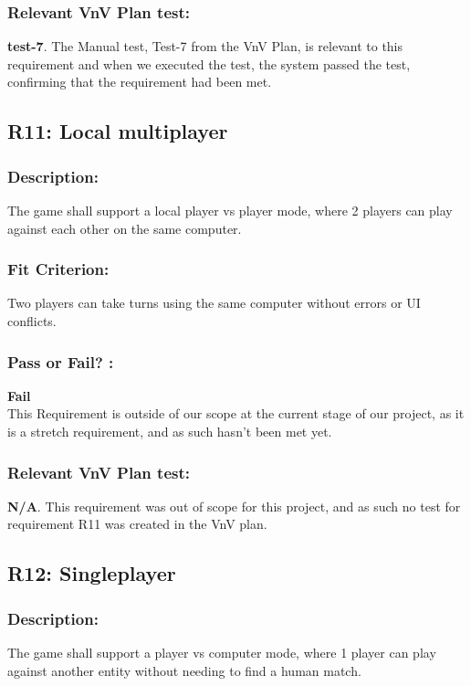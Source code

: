 \documentclass[12pt, titlepage]{article}
\begin{document}
\subsubsection*{Relevant VnV Plan test: } \textbf{test-7}.  The Manual test, Test-7 from the VnV Plan, is relevant to this requirement and when we executed the test, the system passed the test, confirming that the requirement had been met.


\subsection{R11: Local multiplayer} 
\label{R11} 

\subsubsection*{Description:}The game shall support a local player vs player mode, where 2 players can play against each other on the same computer.

\subsubsection*{Fit Criterion:}Two players can take turns using the same computer without errors or UI conflicts.

\subsubsection*{Pass or Fail? :} 

 \noindent \textbf{Fail}\\
 
  This Requirement is outside of our scope at the current stage of our project, as it is a stretch requirement, and as such hasn't been met yet.

\subsubsection*{Relevant VnV Plan test: } \textbf{N/A}. This requirement was out of scope for this project, and as such no test for requirement R11 was created in the VnV plan.


\subsection{R12: Singleplayer} 
\label{R12} 

\subsubsection*{Description:}The game shall support a player vs computer mode, where 1 player can play against another entity without needing to find a human match.
\end{document}
